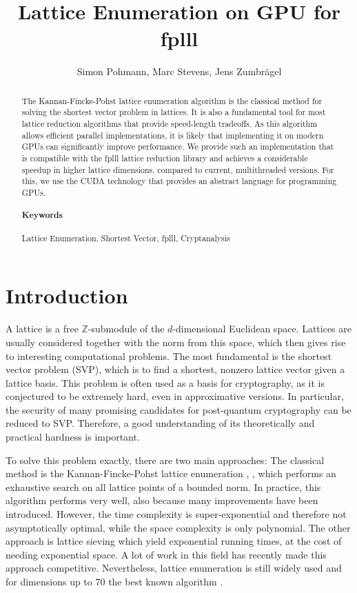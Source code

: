\documentclass{scrartcl}
\title{Lattice Enumeration on GPU for fplll}
\author{Simon Pohmann, Marc Stevens, Jens Zumbrägel}
\newcommand{\Z}{\mathbb{Z}}
\begin{document}
    \maketitle
    
    \begin{abstract}
    The Kannan-Fincke-Pohst lattice enumeration algorithm is the classical method for solving the shortest vector problem in lattices. It is also a fundamental tool for most lattice reduction algorithms that provide speed-length tradeoffs. 
    As this algorithm allows efficient parallel implementations, it is likely that implementing it on modern GPUs can significantly improve performance. 
    We provide such an implementation that is compatible with the fplll lattice reduction library \cite{fplll} and achieves a considerable speedup in higher lattice dimensions, compared to current, multithreaded versions.
    For this, we use the CUDA technology that provides an abstract language for programming GPUs.
    
    \paragraph{Keywords} Lattice Enumeration, Shortest Vector, fplll, Cryptanalysis
    \end{abstract}

    \section{Introduction}

    A lattice is a free $\Z$-submodule of the $d$-dimensional Euclidean space. Lattices are usually considered together with the norm from this space, which then gives rise to interesting computational problems.
    The most fundamental is the shortest vector problem (SVP), which is to find a shortest, nonzero lattice vector given a lattice basis. 
    This problem is often used as a basis for cryptography, as it is conjectured to be extremely hard, even in approximative versions.
    In particular, the security of many promising candidates for post-quantum cryptography can be reduced to SVP. 
    Therefore, a good understanding of its theoretically and practical hardness is important.

    To solve this problem exactly, there are two main approaches:
    The classical method is the Kannan-Fincke-Pohst lattice enumeration \cite{enum1}, \cite{enum}, which performs an exhaustive search on all lattice points of a bounded norm. 
    In practice, this algorithm performs very well, also because many improvements have been introduced.
    However, the time complexity is super-exponential and therefore not asymptotically optimal, while the space complexity is only polynomial.
    The other approach is lattice sieving \cite{sieve} which yield exponential running times, at the cost of needing exponential space. 
    A lot of work in this field has recently made this approach competitive.
    Nevertheless, lattice enumeration is still widely used and for dimensions up to 70 the best known algorithm \cite{g6k}.
\end{document}

